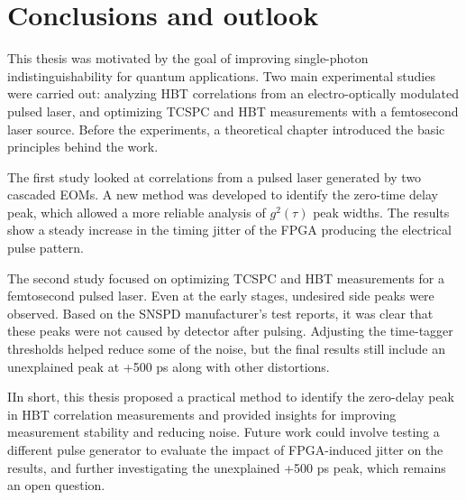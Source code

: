 \chapter{Conclusions and outlook}
\label{Capitolo5}


This thesis was motivated by the goal of improving single-photon indistinguishability for quantum applications. Two main experimental studies were carried out: analyzing HBT correlations from an electro-optically modulated pulsed laser, and optimizing TCSPC and HBT measurements with a femtosecond laser source. Before the experiments, a theoretical chapter introduced the basic principles behind the work.

The first study looked at correlations from a pulsed laser generated by two cascaded EOMs. A new method was developed to identify the zero-time delay peak, which allowed a more reliable analysis of $g^{2}(\tau)$ peak widths. The results show a steady increase in the timing jitter of the FPGA producing the electrical pulse pattern. 

The second study focused on optimizing TCSPC and HBT measurements for a femtosecond pulsed laser. Even at the early stages, undesired side peaks were observed. Based on the SNSPD manufacturer’s test reports, it was clear that these peaks were not caused by detector after pulsing. Adjusting the time-tagger thresholds helped reduce some of the noise, but the final results still include an unexplained peak at +500 ps along with other distortions.

IIn short, this thesis proposed a practical method to identify the zero-delay peak in HBT correlation measurements and provided insights for improving measurement stability and reducing noise. Future work could involve testing a different pulse generator to evaluate the impact of FPGA-induced jitter on the results, and further investigating the unexplained +500 ps peak, which remains an open question.

